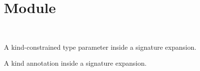 \section{Module }\label{Oxcaml-M_param}%
\label{Oxcaml-M_param--kind-param_kind}\\
\label{Oxcaml-M_param--type-t}\begin{ocamlindent}A kind-constrained type parameter inside a signature expansion.\end{ocamlindent}%
\medbreak
\label{Oxcaml-M_param--type-t_direct}\begin{ocamlindent}A kind annotation inside a signature expansion.\end{ocamlindent}%
\medbreak


